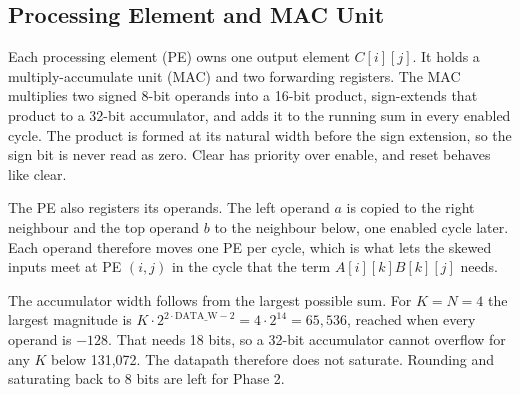 
\subsection{Processing Element and MAC Unit}
Each processing element (PE) owns one output element $C[i][j]$. It holds a multiply-accumulate unit (MAC) and two forwarding registers. The MAC multiplies two signed 8-bit operands into a 16-bit product, sign-extends that product to a 32-bit accumulator, and adds it to the running sum in every enabled cycle. The product is formed at its natural width before the sign extension, so the sign bit is never read as zero. Clear has priority over enable, and reset behaves like clear.

The PE also registers its operands. The left operand $a$ is copied to the right neighbour and the top operand $b$ to the neighbour below, one enabled cycle later. Each operand therefore moves one PE per cycle, which is what lets the skewed inputs meet at PE $(i,j)$ in the cycle that the term $A[i][k]B[k][j]$ needs.

The accumulator width follows from the largest possible sum. For $K = N = 4$ the largest magnitude is $K \cdot 2^{2\cdot\mathrm{DATA\_W}-2} = 4 \cdot 2^{14} = 65{,}536$, reached when every operand is $-128$. That needs 18 bits, so a 32-bit accumulator cannot overflow for any $K$ below 131{,}072. The datapath therefore does not saturate. Rounding and saturating back to 8 bits are left for Phase 2.
